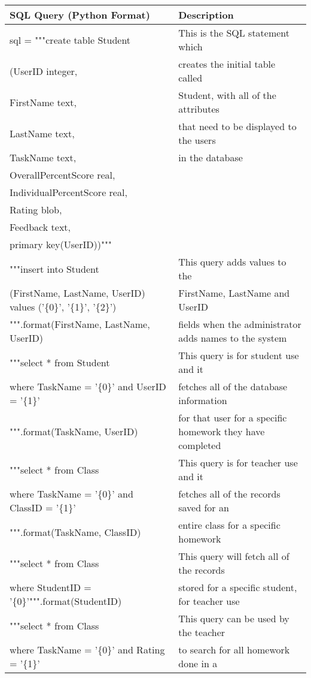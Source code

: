 \begin{center}
\begin{tabular}{|p{8cm}|p{6cm}|} \hline
\textbf{SQL Query (Python Format)} & \textbf{Description} \\ \hline
sql = """create table Student & This is the SQL statement which \\ 
(UserID integer, & creates the initial table called \\
FirstName text, & Student, with all of the attributes \\
LastName text, & that need to be displayed to the users \\
TaskName text, & in the database \\
OverallPercentScore real, & \\
IndividualPercentScore real, &\\
Rating blob, & \\
Feedback text, & \\
primary key(UserID))""" & \\ \hline
"""insert into Student & This query adds values to the \\
(FirstName, LastName, UserID) values ('\{0\}', '\{1\}', '\{2\}') & FirstName, LastName and UserID \\
""".format(FirstName, LastName, UserID) & fields when the administrator adds names to the system \\ \hline
"""select * from Student & This query is for student use and it \\
where TaskName = '\{0\}' and UserID = '\{1\}' & fetches all of the database information \\
""".format(TaskName, UserID) & for that user for a specific homework they have completed \\ \hline
"""select * from Class & This query is for teacher use and it \\
where TaskName = '\{0\}' and ClassID = '\{1\}' & fetches all of the records saved for an\\
""".format(TaskName, ClassID) & entire class for a specific homework \\ \hline
"""select * from Class & This query will fetch all of the records \\
where StudentID = '\{0\}'""".format(StudentID) & stored for a specific student, for teacher use \\ \hline
"""select * from Class & This query can be used by the teacher \\
where TaskName = '\{0\}' and Rating = '\{1\}' & to search for all homework done in a \\

\end{tabular}
\end{center}
